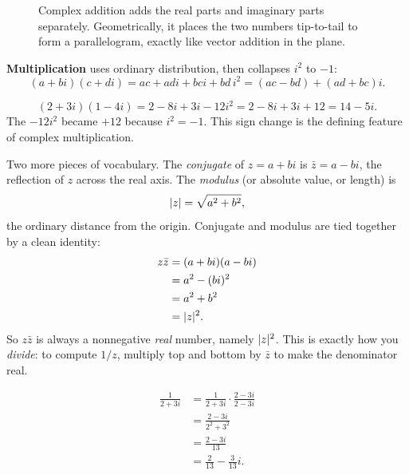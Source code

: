 \begin{figure}[htbp]
\centering
{}
\caption{Complex addition adds the real parts and imaginary parts separately. Geometrically, it places the two numbers tip-to-tail to form a parallelogram, exactly like vector addition in the plane.}
\label{ch39:fig-complex-add}
\end{figure}
\textbf{Multiplication} uses ordinary distribution, then collapses $i^2$ to $-1$:
\[
(a+bi)(c+di) = ac + adi + bci + bd\,i^2 = (ac - bd) + (ad + bc)i.
\]

\begin{example}
\label{ch39:ex-mult}
\[
(2 + 3i)(1 - 4i) = 2 - 8i + 3i - 12 i^2 = 2 - 8i + 3i + 12 = 14 - 5i.
\]
The $-12 i^2$ became $+12$ because $i^2 = -1$. This sign change is the defining feature
of complex multiplication.
\end{example}

Two more pieces of vocabulary. The \emph{conjugate} of $z = a + bi$ is $\bar z = a - bi$, the
reflection of $z$ across the real axis. The \emph{modulus} (or absolute value, or length) is
\[
\lvert z\rvert = \sqrt{a^2 + b^2},
\]
the ordinary distance from the origin. Conjugate and modulus are tied together by a clean identity:
\begin{align*}
z\bar z &= (a+bi)(a-bi) \\
&= a^2 - (bi)^2 \\
&= a^2 + b^2 \\
&= \lvert z\rvert^2.
\end{align*}
So $z\bar z$ is always a nonnegative \emph{real} number, namely $\lvert z\rvert^2$. This is exactly how you
\emph{divide}: to compute $1/z$, multiply top and bottom by $\bar z$ to make the denominator real.

\begin{example}
\label{ch39:ex-div}
\begin{align*}
\frac{1}{2+3i} &= \frac{1}{2+3i}\cdot\frac{2-3i}{2-3i} \\
&= \frac{2-3i}{2^2+3^2} \\
&= \frac{2-3i}{13} \\
&= \frac{2}{13} - \frac{3}{13}i.
\end{align*}
\end{example}

